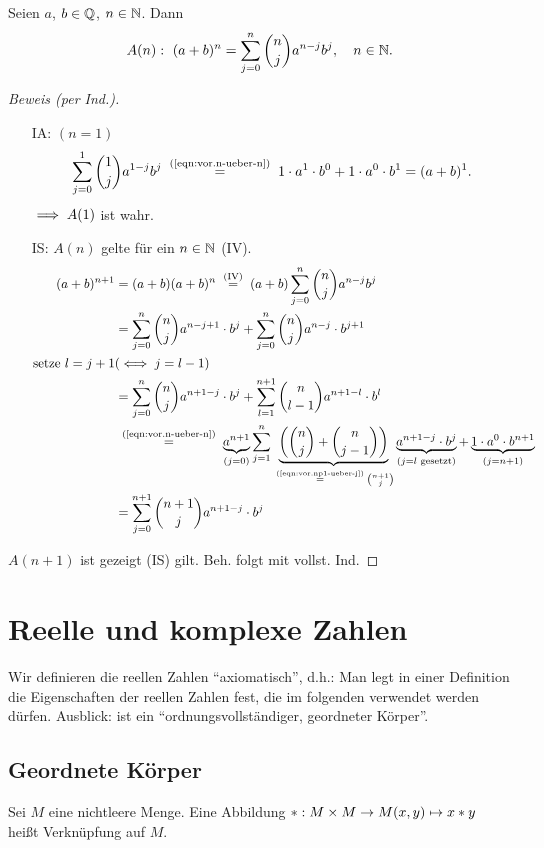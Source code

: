 \documentclass[12pt]{scrreprt}
\begin{document}
\begin{bsp}\label{bsp:vor.binom}

Seien $a$, $b\in\mathbb{Q}$, $n\in\mathbb{N}$. Dann \[A(n):\ (a+b)^n = \sum_{j=0}^n\binom{n}{j}a^{n-j}b^j,\quad n\in\mathbb{N}.\]
\begin{proof}[Beweis (per Ind.)]
\begin{enumerate}
\item[IA:] $(n=1)$
\[\sum_{j=0}^1\binom{1}{j}a^{1-j}b^j \nach{=}{(\ref{eqn:vor.n-ueber-n})} 1\cdot a^1\cdot b^0 + 1\cdot a^0\cdot b^1 = (a+b)^1.\]
$\implies A(1)$ ist wahr.
\item[IS:] $A(n)$ gelte für ein $n\in\mathbb{N}$ (IV).
\begin{align*}
(a+b)^{n+1} &= (a+b)(a+b)^n \nach{=}{(IV)} (a+b)\sum_{j=0}^n\binom{n}{j}a^{n-j}b^j\\
&= \sum_{j=0}^n\binom{n}{j}a^{n-j+1}\cdot b^j + \sum_{j=0}^n\binom{n}{j}a^{n-j}\cdot b^{j+1}\\
\text{setze }l = j+1&(\gdw j = l-1)\\
&=\sum_{j=0}^n\binom{n}{j}a^{n+1-j}\cdot b^j + \sum_{l=1}^{n+1}\binom{n}{l-1}a^{n+1-l}\cdot b^l\\
&\nach{=}{(\ref{eqn:vor.n-ueber-n})} \underbrace{a^{n+1}}_{(j=0)}\sum_{j=1}^n\underbrace{\left(\binom{n}{j}+\binom{n}{j-1}\right)}_{\nach{=}{(\ref{eqn:vor.np1-ueber-j})}\binom{n+1}{j}}\underbrace{a^{n+1-j}\cdot b^j}_{(j=l\text{ gesetzt})}+\underbrace{1\cdot a^0\cdot b^{n+1}}_{(j=n+1)}\\
&= \sum_{j=0}^{n+1}\binom{n+1}{j}a^{n+1-j}\cdot b^j
\end{align*}
\end{enumerate}
\noindent\folgt $A(n+1)$ ist gezeigt \folgt (IS) gilt.
\folgt Beh. folgt mit vollst. Ind.
\end{proof}
\end{bsp}

\chapter{Reelle und komplexe Zahlen}
\label{cha:zahlen}
Wir definieren die reellen Zahlen "`axiomatisch"', d.h.: Man legt in einer Definition die 
Eigenschaften der reellen Zahlen fest, die im folgenden verwendet werden dürfen.
Ausblick:  ist ein "`ordnungsvollständiger, geordneter Körper"'.

\section{Geordnete Körper}
\label{sec:zahlen.geordnete-koerper}
\begin{dfn*}
Sei $M$ eine nichtleere Menge. Eine Abbildung $\ast: M\times M \rightarrow M(x, y) 
\mapsto x \ast y$ heißt Verknüpfung auf $M$.
\end{dfn*}
\end{document}
